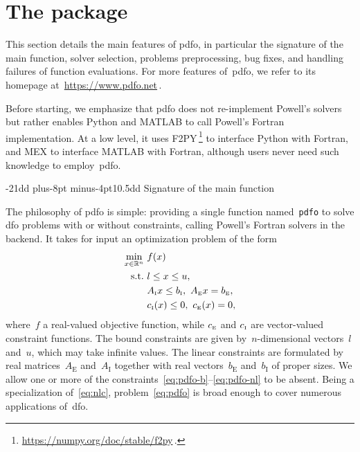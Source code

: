 \documentclass[
    smallextended,  %
    final,          %
]{svjour3}
\makeatletter
\newcommand{\R}{\mathbb{R}}
\newcommand{\aeq}{A_{\scriptscriptstyle\text{E}}}
\newcommand{\aub}{A_{\scriptscriptstyle\text{I}}}
\newcommand{\beq}{b_{\scriptscriptstyle\text{E}}}
\newcommand{\bub}{b_{\scriptscriptstyle\text{I}}}
\newcommand{\ceq}{\con[\scriptscriptstyle{\text{E}}]}
\newcommand{\con}[1][i]{c\ifthenelse{\equal{#1}{}}{}{_{#1}}}
\newcommand{\cub}{\con[\scriptscriptstyle\text{I}]}
\newcommand{\obj}{f}
\newcommand{\st}{\text{s.t.}}
\newcommand{\xl}{l}
\newcommand{\xu}{u}
\newcommand{\pdfofun}{\texttt{pdfo}\xspace}
\def\subsection{\@startsection{subsection}{2}{\z@}%
    {-21dd plus-8pt minus-4pt}{10.5dd}
     {\normalsize\bfseries}}
\makeatother
\begin{document}
\section{The  package}
\label{sec:pdfo}

This section details the main features of \gls{pdfo}, in particular the signature of the main
function, solver selection, problems preprocessing, bug fixes, and handling failures of function
evaluations. For more features of~\gls{pdfo}, we refer to its homepage
at~\url{https://www.pdfo.net}\,.

Before starting, we
emphasize that \gls{pdfo} does not re-implement Powell’s solvers but rather enables Python and MATLAB
to call Powell's Fortran implementation.
At a low level, it uses F2PY\,\footnote{\url{https://numpy.org/doc/stable/f2py}\,.} to interface Python with Fortran, and MEX to
interface MATLAB with Fortran, although users never need such knowledge to employ~\gls{pdfo}.

\subsection{Signature of the main function}

The philosophy of \gls{pdfo} is simple: providing a single function named~\pdfofun to solve
\gls{dfo} problems with or without constraints, calling Powell's Fortran solvers in the backend.
It takes for input an optimization problem of the form
\begin{subequations}
    \label{eq:pdfo}
    \begin{align}
        \min_{x \in \R^n}   & ~ \obj(x)\\
        \st                 & ~ \xl \le x \le \xu, \label{eq:pdfo-b}\\
                            & ~ \aub x \le \bub, ~ \aeq x = \beq, \label{eq:pdfo-l}\\
                            & ~ \cub(x) \le 0, ~ \ceq(x) = 0, \label{eq:pdfo-nl}
    \end{align}
\end{subequations}
where~$\obj$ a real-valued objective function, while $\ceq$ and $\cub$ are vector-valued constraint functions.
The bound constraints are given by~$n$-dimensional vectors~$\xl$ and~$\xu$, which may take infinite values. The linear constraints
are formulated by real matrices~$\aeq$ and~$\aub$ together with real vectors~$\beq$ and~$\bub$ of
proper sizes.
We allow one or more of the constraints~\eqref{eq:pdfo-b}--\eqref{eq:pdfo-nl} to be absent.
Being a specialization of~\eqref{eq:nlc}, problem~\eqref{eq:pdfo} is broad enough to
cover numerous applications of~\gls{dfo}.
\end{document}
